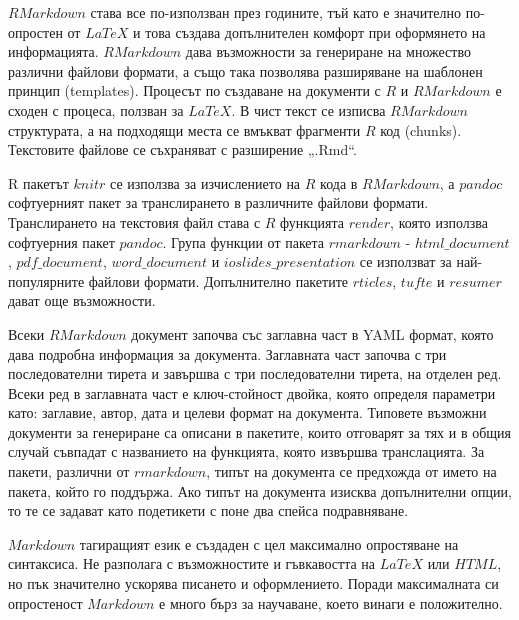 $RMarkdown$ става все по-използван през годините, тъй като е значително по-опростен от $LaTeX$ и това създава допълнителен комфорт при оформянето на информацията. $RMarkdown$ дава възможности за генериране на множество различни файлови формати, а също така позволява разширяване на шаблонен принцип (templates). Процесът по създаване на документи с $R$ и $RMarkdown$ е сходен с процеса, ползван за $LaTeX$. В чист текст се изписва $RMarkdown$ структурата, а на подходящи места се вмъкват фрагменти $R$ код (chunks). Текстовите файлове се съхраняват с разширение „.Rmd“.

R пакетът $knitr$ се използва за изчислението на $R$ кода в $RMarkdown$, а $pandoc$ софтуерният пакет за транслирането в различните файлови формати. Транслирането на текстовия файл става с $R$ функцията $render$, която използва софтуерния пакет $pandoc$. Група функции от пакета $rmarkdown$ - $html\_document$, $pdf\_document$, $word\_document$ и $ioslides\_presentation$ се използват за най-популярните файлови формати. Допълнително пакетите $rticles$, $tufte$ и $resumer$ дават още възможности.

Всеки $RMarkdown$ документ започва със заглавна част в YAML формат, която дава подробна информация за документа. Заглавната част започва с три последователни тирета и завършва с три последователни тирета, на отделен ред. Всеки ред в заглавната част е ключ-стойност двойка, която определя параметри като:  заглавие, автор, дата и целеви формат на документа. Типовете възможни документи за генериране са описани в пакетите, които отговарят за тях и в общия случай съвпадат с названието на функцията, която извършва транслацията. За пакети, различни от $rmarkdown$, типът на документа се предхожда от името на пакета, който го поддържа. Ако типът на документа изисква допълнителни опции, то те се задават като подетикети с поне два спейса подравняване. 

$Markdown$ тагиращият език е създаден с цел максимално опростяване на синтаксиса. Не разполага с възможностите и гъвкавостта на $LaTeX$ или $HTML$, но пък значително ускорява писането и оформлението. Поради максималната си опростеност $Markdown$ е много бърз за научаване, което винаги е положително. 

